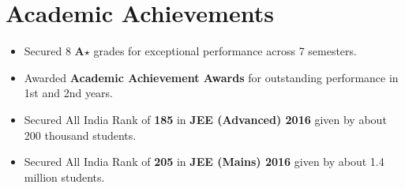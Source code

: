 \section*{Academic Achievements}
\begin{itemize}

\setlength\itemsep{0pt}
\item Secured 8 \textbf{A$\star$} grades for exceptional performance across 7 semesters.
\item Awarded \textbf{Academic Achievement Awards} for outstanding performance in 1st and 2nd years.
\item Secured All India Rank of {\bf 185} in {\bf JEE (Advanced) 2016} given by about 200 thousand students.
\item Secured All India Rank of {\bf 205} in {\bf JEE (Mains) 2016} given by about 1.4 million students.

\end{itemize}

